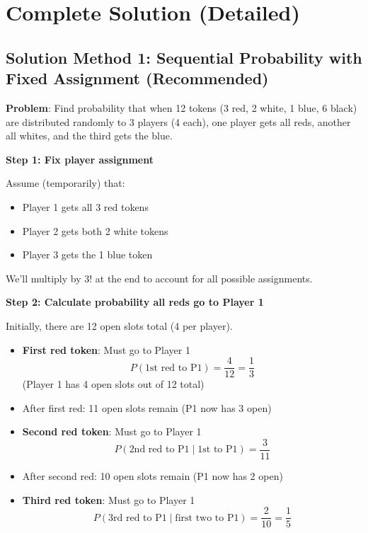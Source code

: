 \documentclass[12pt]{article}
\begin{document}
\section*{Complete Solution (Detailed)}

\subsection*{Solution Method 1: Sequential Probability with Fixed Assignment (Recommended)}

\textbf{Problem}: Find probability that when 12 tokens (3 red, 2 white, 1 blue, 6 black) are distributed randomly to 3 players (4 each), one player gets all reds, another all whites, and the third gets the blue.

\textbf{Step 1: Fix player assignment}

Assume (temporarily) that:
\begin{itemize}
    \item Player 1 gets all 3 red tokens
    \item Player 2 gets both 2 white tokens  
    \item Player 3 gets the 1 blue token
\end{itemize}

We'll multiply by $3!$ at the end to account for all possible assignments.

\textbf{Step 2: Calculate probability all reds go to Player 1}

Initially, there are 12 open slots total (4 per player).

\begin{itemize}
    \item \textbf{First red token}: Must go to Player 1
    \[P(\text{1st red to P1}) = \frac{4}{12} = \frac{1}{3}\]
    (Player 1 has 4 open slots out of 12 total)
    
    \item After first red: 11 open slots remain (P1 now has 3 open)
    
    \item \textbf{Second red token}: Must go to Player 1
    \[P(\text{2nd red to P1} \mid \text{1st to P1}) = \frac{3}{11}\]
    
    \item After second red: 10 open slots remain (P1 now has 2 open)
    
    \item \textbf{Third red token}: Must go to Player 1
    \[P(\text{3rd red to P1} \mid \text{first two to P1}) = \frac{2}{10} = \frac{1}{5}\]
\end{itemize}
\end{document}
